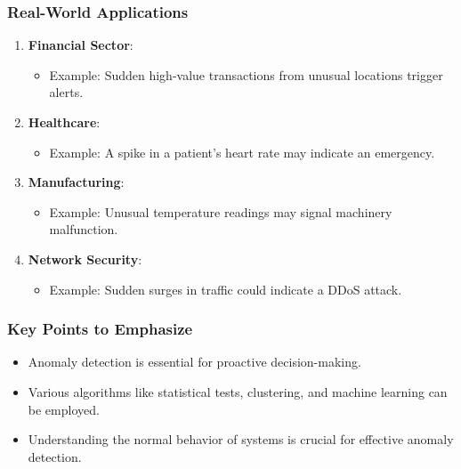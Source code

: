 \documentclass{beamer}
\begin{document}
\begin{frame}[fragile]
    \frametitle{Real-World Applications}
    \begin{enumerate}
        \item \textbf{Financial Sector}:
        \begin{itemize}
            \item Example: Sudden high-value transactions from unusual locations trigger alerts.
        \end{itemize}
        \item \textbf{Healthcare}:
        \begin{itemize}
            \item Example: A spike in a patient's heart rate may indicate an emergency.
        \end{itemize}
        \item \textbf{Manufacturing}:
        \begin{itemize}
            \item Example: Unusual temperature readings may signal machinery malfunction.
        \end{itemize}
        \item \textbf{Network Security}:
        \begin{itemize}
            \item Example: Sudden surges in traffic could indicate a DDoS attack.
        \end{itemize}
    \end{enumerate}
\end{frame}

\begin{frame}[fragile]
    \frametitle{Key Points to Emphasize}
    \begin{itemize}
        \item Anomaly detection is essential for proactive decision-making.
        \item Various algorithms like statistical tests, clustering, and machine learning can be employed.
        \item Understanding the normal behavior of systems is crucial for effective anomaly detection.
    \end{itemize}
\end{frame}
\end{document}
